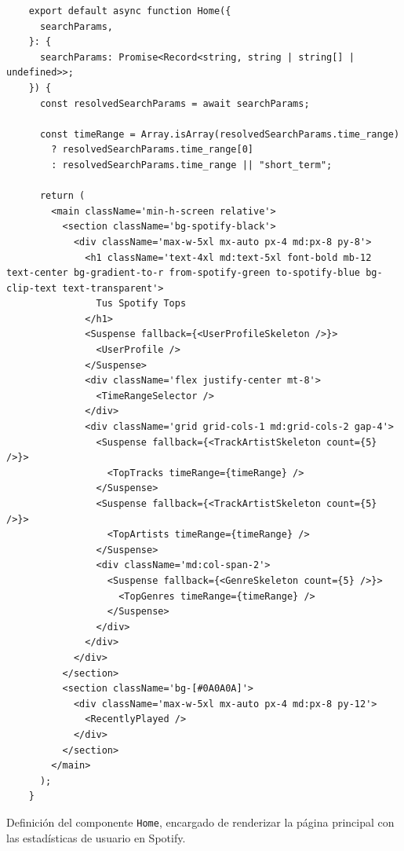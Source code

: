 \begin{ifalgorithm}[H]
    \begin{lstlisting}
    export default async function Home({
      searchParams,
    }: {
      searchParams: Promise<Record<string, string | string[] | undefined>>;
    }) {
      const resolvedSearchParams = await searchParams;

      const timeRange = Array.isArray(resolvedSearchParams.time_range)
        ? resolvedSearchParams.time_range[0]
        : resolvedSearchParams.time_range || "short_term";

      return (
        <main className='min-h-screen relative'>
          <section className='bg-spotify-black'>
            <div className='max-w-5xl mx-auto px-4 md:px-8 py-8'>
              <h1 className='text-4xl md:text-5xl font-bold mb-12 text-center bg-gradient-to-r from-spotify-green to-spotify-blue bg-clip-text text-transparent'>
                Tus Spotify Tops
              </h1>
              <Suspense fallback={<UserProfileSkeleton />}>
                <UserProfile />
              </Suspense>
              <div className='flex justify-center mt-8'>
                <TimeRangeSelector />
              </div>
              <div className='grid grid-cols-1 md:grid-cols-2 gap-4'>
                <Suspense fallback={<TrackArtistSkeleton count={5} />}>
                  <TopTracks timeRange={timeRange} />
                </Suspense>
                <Suspense fallback={<TrackArtistSkeleton count={5} />}>
                  <TopArtists timeRange={timeRange} />
                </Suspense>
                <div className='md:col-span-2'>
                  <Suspense fallback={<GenreSkeleton count={5} />}>
                    <TopGenres timeRange={timeRange} />
                  </Suspense>
                </div>
              </div>
            </div>
          </section>
          <section className='bg-[#0A0A0A]'>
            <div className='max-w-5xl mx-auto px-4 md:px-8 py-12'>
              <RecentlyPlayed />
            </div>
          </section>
        </main>
      );
    }
    \end{lstlisting}
    \caption{Definición del componente \texttt{Home}, encargado de renderizar la página principal con las estadísticas de usuario en Spotify.}
    \label{alg:home_component}
\end{ifalgorithm}

